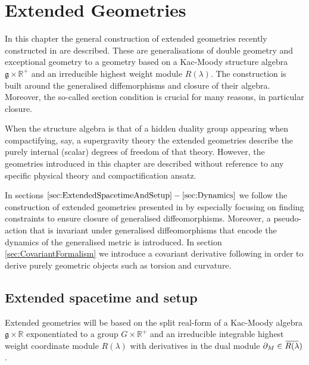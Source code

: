 \chapter{Extended Geometries}\label{chap:ExtendedGeometries}
In this chapter the general construction of extended geometries recently constructed in \cite{CederwallPalmkvist2017} are described. These are generalisations of double geometry and exceptional geometry to a geometry based on a Kac-Moody structure algebra $\mathfrak{g}\times\mathbb{R}^+$ and an irreducible highest weight module $R(\lambda)$. The construction is built around the generalised diffemorphisms and closure of their algebra. Moreover, the so-called section condition is crucial for many reasons, in particular closure.

When the structure algebra is that of a hidden duality group appearing when compactifying, say, a supergravity theory the extended geometries describe the purely internal (scalar) degrees of freedom of that theory. However, the geometries introduced in this chapter are described without reference to any specific physical theory and compactification ansatz. 

In sections $\ref{sec:ExtendedSpacetimeAndSetup}-\ref{sec:Dynamics}$ we follow the construction of extended geometries presented in \cite{CederwallPalmkvist2017} by especially focusing on finding constraints to ensure closure of generalised diffeomorphisms. Moreover, a pseudo-action that is invariant under generalised diffeomorphisms that encode the dynamics of the generalised metric is introduced. In section \ref{sec:CovariantFormalism} we introduce a covariant derivative following \cite{Cederwall:2013naa} in order to derive purely geometric objects such as torsion and curvature. %

\section{Extended spacetime and setup\label{sec:ExtendedSpacetimeAndSetup}}
Extended geometries will be based on the split real-form of a Kac-Moody algebra $\mathfrak{g}\times\mathbb{R}$ exponentiated to a group $G\times\mathbb{R}^+$ and an irreducible integrable highest weight coordinate module $R(\lambda)$ with derivatives in the dual module $\pd_M\in \overbar{R(\lambda})$. 


